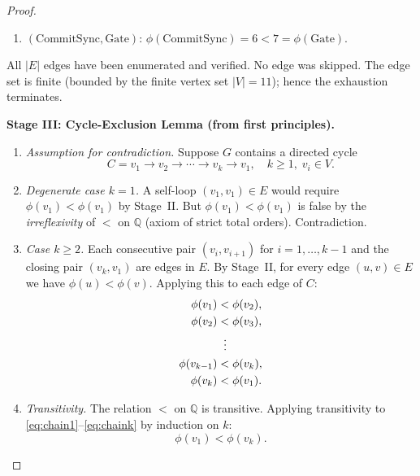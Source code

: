\documentclass[12pt]{article}
\theoremstyle{definition}
\begin{document}
\begin{proof}
\begin{enumerate}
  \item $(\mathrm{CommitSync},\mathrm{Gate})$:
        $\phi(\mathrm{CommitSync}) = 6 < 7 = \phi(\mathrm{Gate})$.
        \checkmark
\end{enumerate}

\noindent
All $|E|$ edges have been enumerated and verified.  No edge was skipped.
The edge set is finite (bounded by the finite vertex set $|V|=11$); hence
the exhaustion terminates.

\medskip
\noindent\textbf{Stage III: Cycle-Exclusion Lemma (from first principles).}

\begin{enumerate}
  \item \emph{Assumption for contradiction.}  Suppose $G$ contains a
        directed cycle
        \begin{equation}
          C = v_1 \to v_2 \to \cdots \to v_k \to v_1,
          \quad k \geq 1,\; v_i \in V. \label{eq:cycle-assume}
        \end{equation}

  \item \emph{Degenerate case $k=1$.}  A self-loop $(v_1,v_1)\in E$ would
        require $\phi(v_1) < \phi(v_1)$ by Stage~II.  But $\phi(v_1) <
        \phi(v_1)$ is false by the \emph{irreflexivity} of $<$ on
        $\mathbb{Q}$ (axiom of strict total orders).  Contradiction.

  \item \emph{Case $k \geq 2$.}  Each consecutive pair $(v_i, v_{i+1})$
        for $i=1,\ldots,k-1$ and the closing pair $(v_k, v_1)$ are edges
        in $E$.  By Stage~II, for every edge $(u,v)\in E$ we have
        $\phi(u) < \phi(v)$.  Applying this to each edge of $C$:
        \begin{align}
          \phi(v_1) &< \phi(v_2),   \label{eq:chain1}\\
          \phi(v_2) &< \phi(v_3),   \label{eq:chain2}\\
                    &\;\;\vdots     \notag \\
          \phi(v_{k-1}) &< \phi(v_k), \label{eq:chaink}\\
          \phi(v_k) &< \phi(v_1).   \label{eq:chainclose}
        \end{align}

  \item \emph{Transitivity.}  The relation $<$ on $\mathbb{Q}$ is
        transitive.  Applying transitivity to
        \eqref{eq:chain1}--\eqref{eq:chaink} by induction on $k$:
        \begin{equation}
          \phi(v_1) < \phi(v_k). \label{eq:trans-result}
        \end{equation}


\end{enumerate}
\end{proof}
\end{document}
